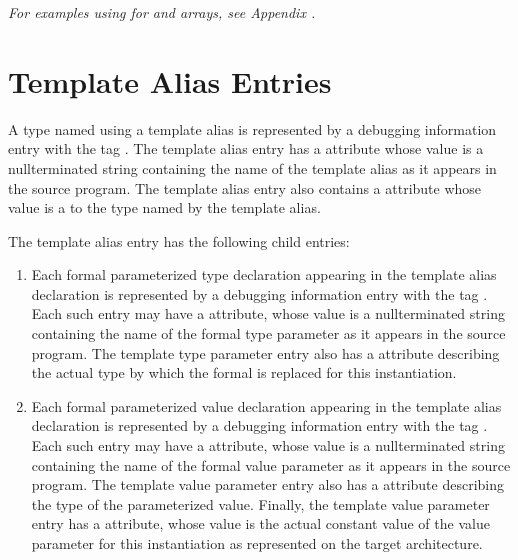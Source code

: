 \textit{For examples using 
 for  and 
arrays, 
see Appendix .}



\section{Template Alias Entries}
\label{chap:templatealiasentries}

A type named using a template alias is represented
by a debugging information entry 
with the tag
. 
The template alias entry has a
 attribute 
whose value is a null\dash terminated string
containing the name of the template alias as it appears in
the source program. The template alias entry also contains 
a
 attribute 
whose value is a 
to the type named by the template alias. 

The template alias entry has the following child entries:
\begin{enumerate}[1. ]
\item Each formal parameterized type declaration appearing
in the template alias declaration is represented
by a debugging information entry with the tag
. 
Each such entry may have
a  attribute,
whose value is a null\dash terminated
string containing the name of the formal type parameter as it
appears in the source program. The template type parameter
entry also has 
a  attribute
describing the actual
type by which the formal is replaced for this instantiation.

\item Each formal parameterized value declaration
appearing in the template alias declaration is
represented by a debugging information entry with the tag
. 
Each such entry may have
a  attribute,
whose value is a null\dash terminated
string containing the name of the formal value parameter
as it appears in the source program. The template value
parameter entry also has 
a  attribute describing
the type of the parameterized value. Finally, the template
value parameter entry has a  
attribute, whose value is the actual constant value of the value parameter for
this instantiation as represented on the target architecture.
\end{enumerate}

